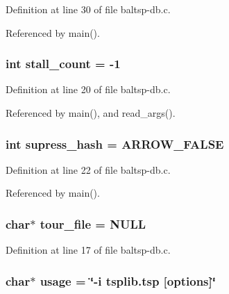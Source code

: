 Definition at line 30 of file baltsp-db.c.

Referenced by main().\hypertarget{bin_2baltsp-db_8c_a1641a28cf3ea572a56763e84518c17b}{
\subsubsection[{stall\_\-count}]{\setlength{\rightskip}{0pt plus 5cm}int {\bf stall\_\-count} = -1}}
\label{bin_2baltsp-db_8c_a1641a28cf3ea572a56763e84518c17b}




Definition at line 20 of file baltsp-db.c.

Referenced by main(), and read\_\-args().\hypertarget{bin_2baltsp-db_8c_c022145e682345ed4064bad274e5a4f1}{
\subsubsection[{supress\_\-hash}]{\setlength{\rightskip}{0pt plus 5cm}int {\bf supress\_\-hash} = ARROW\_\-FALSE}}
\label{bin_2baltsp-db_8c_c022145e682345ed4064bad274e5a4f1}




Definition at line 22 of file baltsp-db.c.

Referenced by main().\hypertarget{bin_2baltsp-db_8c_b818a82f867be75d7c4d92d792b0943e}{
\subsubsection[{tour\_\-file}]{\setlength{\rightskip}{0pt plus 5cm}char$\ast$ {\bf tour\_\-file} = NULL}}
\label{bin_2baltsp-db_8c_b818a82f867be75d7c4d92d792b0943e}




Definition at line 17 of file baltsp-db.c.\hypertarget{bin_2baltsp-db_8c_adebe2487a2c5240ab6cd02c83add0bf}{
\subsubsection[{usage}]{\setlength{\rightskip}{0pt plus 5cm}char$\ast$ {\bf usage} = \char`\"{}-i tsplib.tsp \mbox{[}{\bf options}\mbox{]}\char`\"{}}}
\label{bin_2baltsp-db_8c_adebe2487a2c5240ab6cd02c83add0bf}




